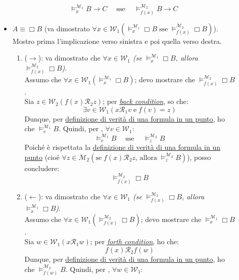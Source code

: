 \documentclass[a4paper,12pt]{article}
\newcommand{\latinmodern}[1]{\text{#1}}
\newcommand{\latinmath}[1]{\text{\latinmodern{#1}}} %
\begin{document}
\begin{dimo}
\begin{description}
\begin{itemize}
			            $$\vDash_x^{\mathcal{M}_1} B \to C \quad \; \text{sse} \quad \; \vDash_{f(x)}^{\mathcal{M}_2} B \to C$$
			      \item $A \equiv \Box B$ (va dimostrato \emph{$\forall x \in \mathcal{W}_1 (\vDash_x^{\mathcal{M}_1} \Box B \; \text{sse} \; \vDash_{f(x)}^{\mathcal{M}_2} \Box B)$}). Mostro prima l'implicazione verso sinistra e poi quella verso destra.
			            \begin{enumerate}
				            \item ($\to$): va dimostrato che \emph{$\forall x \in \mathcal{W}_1$ (se $\vDash_x^{\mathcal{M}_1} \Box B$, allora $\vDash_{f(x)}^{\mathcal{M}_2} \Box B$)}. \\
				                  Assumo che $\forall x \in \mathcal{W}_1 (\vDash_x^{\mathcal{M}_1} \Box B)$; devo mostrare che $\vDash_{f(x)}^{\mathcal{M}_2} \Box B$. \\
				                  Sia $z \in \mathcal{W}_2 (f(x)\mathcal{R}_2z)$; per \hyperlink{back}{\emph{back condition}}, so che:
				                  $$\exists v \in \mathcal{W}_1 (x\mathcal{R}_1v \; \text{e} \; f(v)=z)$$
				                  Dunque, per \hyperlink{defverp}{definizione di verità di una formula in un punto}, ho che $\vDash_v^{\mathcal{M}_1} B$. Quindi, per \latinmath{IH1}, $\forall v \in \mathcal{W}_1$:
				                  $$\vDash_v^{\mathcal{M}_1} B \quad \; \text{sse} \quad \; \vDash_{z}^{\mathcal{M}_2} B $$
				                  Poiché è rispettata la \hyperlink{defverp}{definizione di verità di una formula in un punto} (cioé $\forall z \in \mathcal{M}_2 (\text{se} \; f(x)\mathcal{R}_2z \text{, allora} \; \vDash_z^{\mathcal{M}_2} B)$), posso concludere:
				                  $$\vDash_{f(x)}^{\mathcal{M}_2} \Box B$$
				            \item ($\leftarrow$): va dimostrato che \emph{$\forall x \in \mathcal{W}_1$ (se $\vDash_{f(x)}^{\mathcal{M}_2} \Box B$, allora $\vDash_x^{\mathcal{M}_1} \Box B$)}. \\
				                  Assumo che $\forall x \in \mathcal{W}_1 (\vDash_{f(x)}^{\mathcal{M}_2} \Box B)$; devo mostrare che $\vDash_x^{\mathcal{M}_1} \Box B$. \\
				                  Sia $w \in \mathcal{W}_1(x\mathcal{R}_1w)$; per \hyperlink{forth}{\emph{forth condition}}, ho che:
				                  $$f(x)\mathcal{R}_2f(w)$$
				                  Dunque, per \hyperlink{defverp}{definizione di verità di una formula in un punto}, ho che $\vDash_{f(w)}^{\mathcal{M}_2} B$. Quindi, per \latinmath{IH1}, $\forall w \in \mathcal{W}_1$:

\end{enumerate}
\end{itemize}
\end{description}
\end{dimo}
\end{document}
